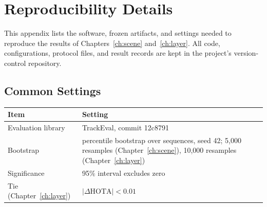 \chapter{Reproducibility Details}\label{app:repro}

This appendix lists the software, frozen artifacts, and settings needed to reproduce the results of Chapters~\ref{ch:scene} and~\ref{ch:layer}. All code, configurations, protocol files, and result records are kept in the project's version-control repository.

\section{Common Settings}
\begin{longtable}{@{}p{4.6cm}p{9.8cm}@{}}
\toprule
Item & Setting \\
\midrule
Evaluation library & TrackEval, commit 12c8791 \\
Bootstrap & percentile bootstrap over sequences, seed 42; 5,000 resamples (Chapter~\ref{ch:scene}), 10,000 resamples (Chapter~\ref{ch:layer}) \\
Significance & 95\% interval excludes zero \\
Tie (Chapter~\ref{ch:layer}) & $|\Delta\mathrm{HOTA}|<0.01$ \\
\bottomrule
\end{longtable}

